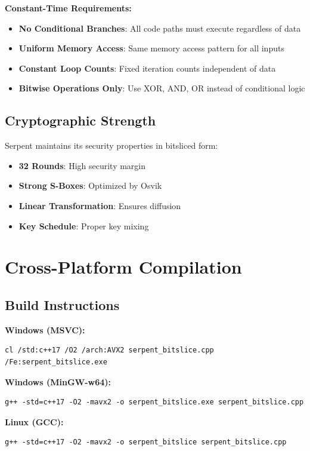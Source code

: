 \documentclass[12pt,a4paper]{article}
\begin{document}
\textbf{Constant-Time Requirements:}
\begin{itemize}
    \item \textbf{No Conditional Branches}: All code paths must execute regardless of data
    \item \textbf{Uniform Memory Access}: Same memory access pattern for all inputs
    \item \textbf{Constant Loop Counts}: Fixed iteration counts independent of data
    \item \textbf{Bitwise Operations Only}: Use XOR, AND, OR instead of conditional logic
\end{itemize}

\subsection{Cryptographic Strength}
Serpent maintains its security properties in bitsliced form:
\begin{itemize}
    \item \textbf{32 Rounds}: High security margin
    \item \textbf{Strong S-Boxes}: Optimized by Osvik
    \item \textbf{Linear Transformation}: Ensures diffusion
    \item \textbf{Key Schedule}: Proper key mixing
\end{itemize}

\section{Cross-Platform Compilation}

\subsection{Build Instructions}

\textbf{Windows (MSVC):}
\begin{verbatim}
cl /std:c++17 /O2 /arch:AVX2 serpent_bitslice.cpp /Fe:serpent_bitslice.exe
\end{verbatim}

\textbf{Windows (MinGW-w64):}
\begin{verbatim}
g++ -std=c++17 -O2 -mavx2 -o serpent_bitslice.exe serpent_bitslice.cpp
\end{verbatim}

\textbf{Linux (GCC):}
\begin{verbatim}
g++ -std=c++17 -O2 -mavx2 -o serpent_bitslice serpent_bitslice.cpp
\end{verbatim}
\end{document}
